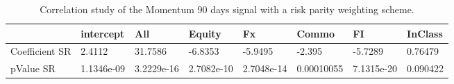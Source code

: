 \begin{table}[H]
\centering
\begin{tabular}{llllllll}
& intercept & All & Equity & Fx & Commo & FI & InClass \\ 
\hline 
Coefficient SR & 2.4112 & 31.7586 & -6.8353 & -5.9495 & -2.395 & -5.7289 & 0.76479 \\ 
pValue SR & 1.1346e-09 & 3.2229e-16 & 2.7082e-10 & 2.7048e-14 & 0.00010055 & 7.1315e-20 & 0.090422 \\ 
\hline
\end{tabular}
\caption{Correlation study of the Momentum 90 days signal with a risk parity weighting scheme.}
\label{MOM90RP_CORR}
\end{table}
